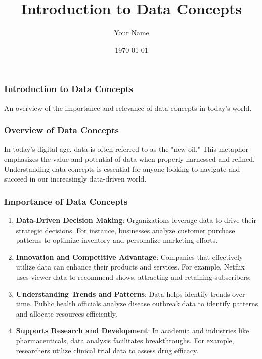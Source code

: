 \documentclass{beamer}
\title{Introduction to Data Concepts}
\author{Your Name}
\institute{Your Institution}
\date{\today}
\begin{document}
\frame{\titlepage}

\begin{frame}[fragile]
    \frametitle{Introduction to Data Concepts}
    An overview of the importance and relevance of data concepts in today's world.
\end{frame}

\begin{frame}[fragile]
    \frametitle{Overview of Data Concepts}
    In today's digital age, data is often referred to as the "new oil." This metaphor emphasizes the value and potential of data when properly harnessed and refined. Understanding data concepts is essential for anyone looking to navigate and succeed in our increasingly data-driven world.
\end{frame}

\begin{frame}[fragile]
    \frametitle{Importance of Data Concepts}
    \begin{enumerate}
        \item \textbf{Data-Driven Decision Making}: Organizations leverage data to drive their strategic decisions. For instance, businesses analyze customer purchase patterns to optimize inventory and personalize marketing efforts.
        
        \item \textbf{Innovation and Competitive Advantage}: Companies that effectively utilize data can enhance their products and services. For example, Netflix uses viewer data to recommend shows, attracting and retaining subscribers.
        
        \item \textbf{Understanding Trends and Patterns}: Data helps identify trends over time. Public health officials analyze disease outbreak data to identify patterns and allocate resources efficiently.
        
        \item \textbf{Supports Research and Development}: In academia and industries like pharmaceuticals, data analysis facilitates breakthroughs. For example, researchers utilize clinical trial data to assess drug efficacy.
    \end{enumerate}
\end{frame}
\end{document}
